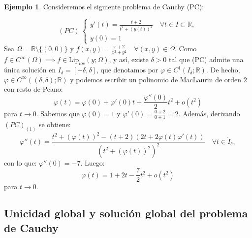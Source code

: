 \documentclass[11pt]{article}
\theoremstyle{definition} %
\newtheorem{example}[theorem]{Ejemplo}
\newcommand{\R}{\mathbb{R}}
\begin{document}
\begin{example} Consideremos el siguiente problema de Cauchy (PC):

	\[ (PC) \ \begin{cases}
		y'(t) = \frac{t+2}{t^2+(y(t))^2} \quad \forall t \in I \subset \R, \\
		y(0) = 1
	\end{cases} \]
	Sea $\Omega = \R \setminus \{(0,0)\}$ y $f(x,y) = \frac{x+2}{x^2 + y^2} \quad \forall (x,y) \in \Omega$. Como $f \in C^{\infty}(\Omega) \implies f \in \text{Lip}_{loc}(y;\Omega)$, y así, existe $\delta > 0$ tal que (PC) admite una única solución en $I_{\delta} = [-\delta,\delta]$, que denotamos por $\varphi \in C^{1}(I_{\delta};\R)$. De hecho, $\varphi \in C^{\infty}((\delta,\delta);\R)$ y podemos escribir un polinomio de MacLaurin de orden $2$ con resto de Peano:
	\[ \varphi(t) = \varphi(0) + \varphi'(0)t + \frac{\varphi''(0)}{2}t^2 + o(t^2) \]
	para $t \to 0$. Sabemos que $\varphi(0) = 1$ y $\varphi'(0) = \frac{0+2}{0+1}=2$. Además, derivando $(PC)_{(1)}$ se obtiene:
	\[ \varphi''(t) = \frac{t^2 + (\varphi(t))^2 - (t+2)(2t+2\varphi(t)\varphi'(t))}{(t^2 + (\varphi(t))^2)^2} \quad \forall t \in \mathring{I}_{\delta}, \]
	con lo que: $\varphi''(0) = -7$. Luego:
	\[ \varphi(t) = 1 + 2t - \frac{7}{2}t^2 + o(t^2) \]
	para $t \to 0$.
\end{example}

\subsection*{ Unicidad global y solución global del problema de Cauchy}
\end{document}

